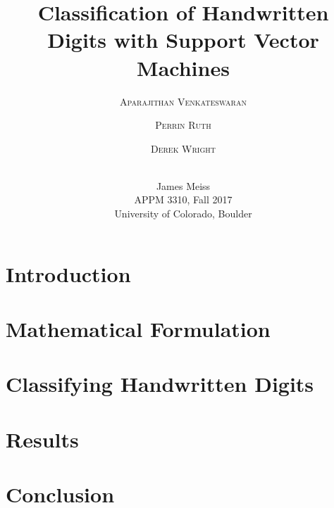 \documentclass[11pt, onecolumn]{article}
\title{Classification of Handwritten Digits with Support Vector Machines} %
\author{%
\textsc{Aparajithan Venkateswaran} \\[1ex] %
\and %
\textsc{Perrin Ruth} \\[1ex] %
\and %
\textsc{Derek Wright} \\[1ex] %
}
\date{~\\James Meiss \\APPM 3310, Fall 2017 \\University of Colorado, Boulder}
\begin{document}
\maketitle


\section{Introduction}
\label{section:introduction}




\section{Mathematical Formulation}
\label{section:math}




\section{Classifying Handwritten Digits}
\label{section:experiments}




\section{Results}
\label{section:results}




\section{Conclusion}
\label{section:conclusion}



%
%

\newpage
\nocite{*}



%
%

\newpage
\appendix










\end{document}
